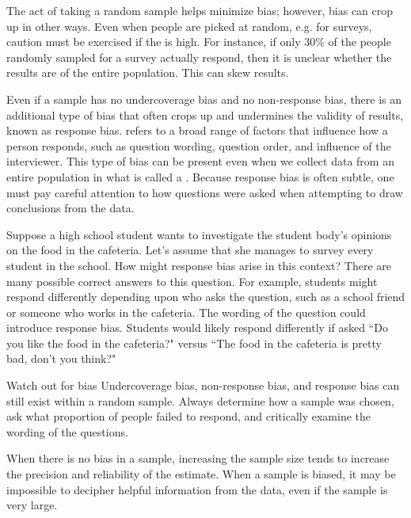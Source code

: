 The act of taking a random sample helps minimize bias; however, bias can crop up in other ways. Even when people are picked at random, e.g. for surveys, caution must be exercised if the   is high. For instance, if only 30\% of the people randomly sampled for a survey actually respond, then it is unclear whether the results are  of the entire population. This   can skew results.

Even if a sample has no undercoverage bias and no non-response bias, there is an additional type of bias that often crops up and undermines the validity of results, known as response bias.  refers to a broad range of factors that influence how a person responds, such as question wording, question order, and influence of the interviewer. This type of bias can be present even when we collect data from an entire population in what is called a . Because response bias is often subtle, one must pay careful attention to how questions were asked when attempting to draw conclusions from the data.

\begin{examplewrap}
\begin{nexample}{Suppose a high school student wants to investigate the student body's opinions on the food in the cafeteria. Let's assume that she manages to survey every student in the school. How might response bias arise in this context?}
There are many possible correct answers to this question. For example, students might respond differently depending upon who asks the question, such as a school friend or someone who works in the cafeteria. The wording of the question could introduce response bias. Students would likely respond differently if asked ``Do you like the food in the cafeteria?" versus ``The food in the cafeteria is pretty bad, don't you think?"
\end{nexample}
\end{examplewrap}

\begin{onebox}{Watch out for bias}
Undercoverage bias, non-response bias, and response bias can still exist within a random sample. Always determine how a sample was chosen, ask what proportion of people failed to respond, and critically examine the wording of the questions.
\end{onebox}

When there is no bias in a sample, increasing the sample size tends to increase the precision and reliability of the estimate. When a sample is biased, it may be impossible to decipher helpful information from the data, even if the sample is very large.

